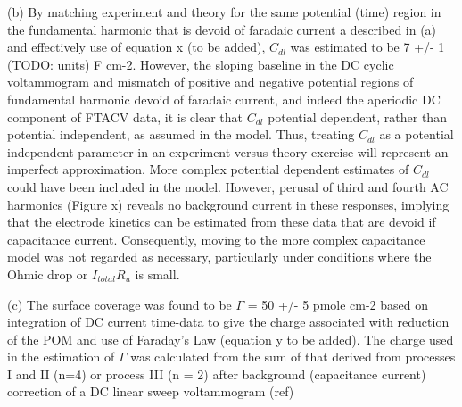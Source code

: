 \documentclass[a4paper, 12pt]{article}
\begin{document}
(b) By matching experiment and theory  for the same potential (time) region in 
the fundamental  harmonic that is devoid of faradaic current a described in (a) 
and effectively use of equation x (to be added), $C_{dl}$ was estimated to be 7 
+/- 1 (TODO: units) F cm-2. However, the sloping baseline in  the DC cyclic 
voltammogram and mismatch of positive and negative potential regions of 
fundamental harmonic devoid of faradaic current, and indeed the aperiodic DC 
component of FTACV data, it is clear that $C_{dl}$  potential dependent, rather 
than potential independent, as assumed in the model. Thus, treating $C_{dl}$ as a 
potential independent parameter in an experiment versus theory exercise will 
represent an imperfect approximation.  More complex potential dependent 
estimates of $C_{dl}$ could have been included in the model. However, perusal of 
third and fourth AC harmonics (Figure x) reveals no background current in these 
responses, implying that the electrode kinetics can be estimated from these data 
that are devoid if capacitance current.  Consequently, moving to the more 
complex capacitance model was not regarded as necessary, particularly under 
conditions where the Ohmic drop or $I_{total} R_u$ is small.

(c) The surface coverage was found to be $\Gamma$ = 50 +/- 5 pmole cm-2 based on 
integration of DC current time-data to give the charge associated with reduction 
of the POM and use of Faraday’s Law (equation y to be added). The charge used in 
the estimation of $\Gamma$ was calculated from the sum of that derived from 
processes I and II (n=4) or process   III (n = 2) after   background 
(capacitance current) correction of a DC linear sweep voltammogram (ref)
\end{document}

